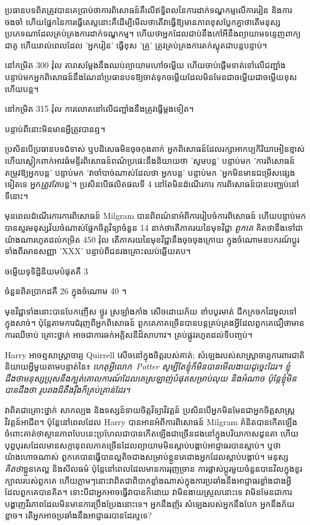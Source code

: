 {{{{{{{ប្រធានបទពិតត្រូវបានគេប្រាប់ថាការពិសោធន៍គឺលើឥទ្ធិពលនៃការដាក់ទណ្ឌកម្មលើការរៀន និងការចងចាំ ហើយផ្នែកនៃការធ្វើតេស្តនោះគឺដើម្បីមើលថាតើវាធ្វើឱ្យមានភាពខុសប្លែកគ្នាថាតើមនុស្សប្រភេទណាដែលគ្រប់គ្រងការដាក់ទណ្ឌកម្ម។ ហើយ​ថា​អ្នក​ដែល​ជាប់​នឹង​កៅអី​នឹង​ព្យាយាម​ទន្ទេញ​ពាក្យ​ជា​គូ ហើយ​រាល់​ពេល​ដែល 'អ្នក​រៀន' ធ្វើ​ខុស 'គ្រូ' ត្រូវ​គ្រប់គ្រង​ការ​តក់ស្លុត​ជា​បន្តបន្ទាប់។

នៅកម្រិត 300 វ៉ុល តារាសម្តែងនឹងឈប់ព្យាយាមហៅចម្លើយ ហើយចាប់ផ្តើមទាត់ទៅលើជញ្ជាំង បន្ទាប់មកអ្នកពិសោធន៍នឹងណែនាំប្រធានបទឱ្យចាត់ទុកចម្លើយដែលមិនមែនជាចម្លើយជាចម្លើយខុស ហើយបន្ត។

នៅកម្រិត 315 វ៉ុល ការលោតនៅលើជញ្ជាំងនឹងត្រូវធ្វើម្តងទៀត។

បន្ទាប់​ពី​នោះ​មិន​មាន​អ្វី​ត្រូវ​បាន​ឮ។

ប្រសិនបើប្រធានបទជំទាស់ ឬបដិសេធមិនចុចកុងតាក់ អ្នកពិសោធន៍ដែលរក្សាអាកប្បកិរិយាអៀនខ្មាស់ ហើយស្លៀកពាក់អាវធំមន្ទីរពិសោធន៍ពណ៌ប្រផេះនឹងនិយាយថា 'សូមបន្ត' បន្ទាប់មក 'ការពិសោធន៍តម្រូវឱ្យអ្នកបន្ត' បន្ទាប់មក 'វាចាំបាច់ណាស់ដែលថា អ្នកបន្ត' បន្ទាប់មក 'អ្នកមិនមានជម្រើសផ្សេងទៀតទេ អ្នក\emph{ត្រូវតែ}បន្ត'។ ប្រសិនបើផលិតផលទី 4 នៅតែមិនដំណើរការ ការពិសោធន៍បានបញ្ឈប់នៅទីនោះ។

មុនពេលដំណើរការការពិសោធន៍ Milgram បានពិពណ៌នាអំពីការរៀបចំការពិសោធន៍ ហើយបន្ទាប់មកបានសួរមនុស្សវ័យចំណាស់ផ្នែកចិត្តវិទ្យាចំនួន 14 នាក់ថាតើភាគរយនៃមុខវិជ្ជា \emph{ពួកគេ} គិតថានឹងទៅជាយ៉ាងណារហូតដល់កម្រិត 450 វ៉ុល តើភាគរយនៃមុខវិជ្ជានឹងចុចចុងក្រោយ ក្នុងចំណោមឧបករណ៍ប្តូរទាំងពីរមានសញ្ញា 'XXX' បន្ទាប់ពីជនរងគ្រោះឈប់ឆ្លើយតប។

ចម្លើយទុទិដ្ឋិនិយមបំផុតគឺ 3%

ចំនួនពិតប្រាកដគឺ 26 ក្នុងចំណោម 40 ។

មុខវិជ្ជាទាំងនោះបានបែកញើស ថ្ងូរ ស្រឡាំងកាំង សើចដោយភ័យ ខាំបបូរមាត់ ជីកក្រចកដៃចូលទៅក្នុងសាច់។ ប៉ុន្តែ​តាម​ការ​ជំរុញ​ពី​អ្នក​ពិសោធន៍ ពួកគេ​ភាគច្រើន​បាន​បន្ត​គ្រប់គ្រង​អ្វី​ដែល​ពួកគេ​ជឿថា​មាន​ការឈឺចាប់ គ្រោះថ្នាក់ អាចជា​ការ​ឆក់​អគ្គិសនី​ដ៏​សាហាវ​។ គ្រប់ផ្លូវរហូតដល់ទីបញ្ចប់។

Harry អាចឮសាស្ត្រាចារ្យ Quirrell សើចនៅក្នុងចិត្តរបស់គាត់; សំឡេងរបស់សាស្ត្រាចារ្យការពារជាតិនិយាយអ្វីមួយតាមបន្ទាត់នៃ៖ \emph{ ហេតុអ្វីលោក~Potter សូម្បីតែខ្ញុំក៏មិនបានមើលងាយដូច្នេះដែរ។ ខ្ញុំដឹងថាមនុស្សប្រុសនឹងក្បត់គោលការណ៍ដែលគេស្រឡាញ់បំផុតសម្រាប់លុយ និងអំណាច ប៉ុន្តែខ្ញុំមិនបានដឹងថា រូបរាងដ៏តឹងរ៉ឹងក៏គ្រប់គ្រាន់ដែរ។}

វាពិតជាគ្រោះថ្នាក់ សាកល្បង និងទស្សន៍ទាយចិត្តវិទ្យាវិវត្តន៍ ប្រសិនបើអ្នកមិនមែនជាអ្នកចិត្តសាស្រ្តវិវត្តន៍អាជីព។ ប៉ុន្តែនៅពេលដែល Harry បានអានអំពីការពិសោធន៍ Milgram គំនិតបានកើតឡើងចំពោះគាត់ថាស្ថានភាពបែបនេះប្រហែលជាបានកើតឡើងជាច្រើនដងនៅក្នុងបរិយាកាសដូនតា ហើយបុព្វបុរសដែលមានសក្តានុពលភាគច្រើនដែលព្យាយាមមិនស្តាប់បង្គាប់អាជ្ញាធរបានស្លាប់។ ឬថា យ៉ាងហោចណាស់ ពួកគេបានធ្វើបានល្អតិចជាងសម្រាប់ខ្លួនគេជាងអ្នកដែលស្តាប់បង្គាប់។ មនុស្ស\emph{គិតថា}ខ្លួនគេល្អ និងសីលធម៌ ប៉ុន្តែនៅពេលដែលមានការរុញច្រាន ការផ្លាស់ប្តូរមួយចំនួនបានវិលក្នុងខួរក្បាលរបស់ពួកគេ ហើយភ្លាមៗនោះវាពិតជាពិបាកខ្លាំងណាស់ក្នុងការប្រឆាំងនឹងអាជ្ញាធរខ្លាំងជាងអ្វីដែលពួកគេបានគិត។ ទោះបីជាអ្នកអាចធ្វើវាបានក៏ដោយ វាមិនងាយស្រួលនោះទេ វាមិនមែនជាការបង្ហាញវីរភាពដែលមិនមានការប្រឹងប្រែងនោះទេ។ អ្នកនឹងញ័រ សំឡេងរបស់អ្នកនឹងបែក អ្នកនឹងភ័យខ្លាច។ តើអ្នកអាចប្រឆាំងនឹងអាជ្ញាធរបានដែរឬទេ?

}}}}}}}
